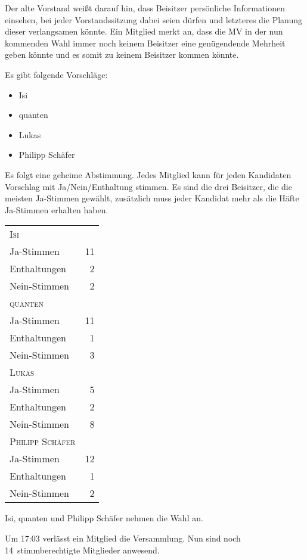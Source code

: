 \documentclass[DIV=calc,parksip=half*]{scrartcl}
\newcommand{\fiveop}{Philipp Schäfer}
\newcommand{\quanten}{quanten}
\newcommand{\isi}{Isi}
\begin{document}
Der alte Vorstand weißt darauf hin, dass Beisitzer persönliche Informationen einsehen, bei jeder Vorstandssitzung dabei seien dürfen und letzteres die Planung dieser verlangsamen könnte. Ein Mitglied merkt an, dass die MV in der nun kommenden Wahl immer noch keinem Beisitzer eine genügendende Mehrheit geben könnte und es somit zu keinem Beisitzer kommen könnte. 

Es gibt folgende Vorschläge:
\begin{itemize}
 \item \isi{}
 \item \quanten{}
 \item Lukas
 \item \fiveop{}
\end{itemize}

Es folgt eine geheime Abstimmung. Jedes Mitglied kann für jeden Kandidaten Vorschlag mit Ja/Nein/Enthaltung stimmen. Es sind die drei Beisitzer, die die meisten Ja-Stimmen gewählt, zusätzlich muss jeder Kandidat mehr als die Häfte Ja-Stimmen erhalten haben.

\begin{tabularx}{\linewidth}{Xr}
    \toprule
    \textsc{\isi{}}\\
    Ja-Stimmen & 11 \\
    Enthaltungen & 2 \\
    Nein-Stimmen & 2 \\
    \midrule
    \textsc{\quanten{}}\\
    Ja-Stimmen & 11 \\
    Enthaltungen & 1 \\
    Nein-Stimmen & 3 \\
    \midrule
    \textsc{Lukas}\\
    Ja-Stimmen & 5 \\
    Enthaltungen & 2 \\
    Nein-Stimmen & 8 \\
    \midrule
    \textsc{\fiveop{}}\\
    Ja-Stimmen & 12 \\
    Enthaltungen & 1 \\
    Nein-Stimmen & 2 \\
    \bottomrule
\end{tabularx}
\par

\isi{}, \quanten{} und \fiveop{} nehmen die Wahl an.


Um 17:03 verlässt ein Mitglied die Versammlung. Nun sind noch 14~stimmberechtigte Mitglieder anwesend.
\end{document}
